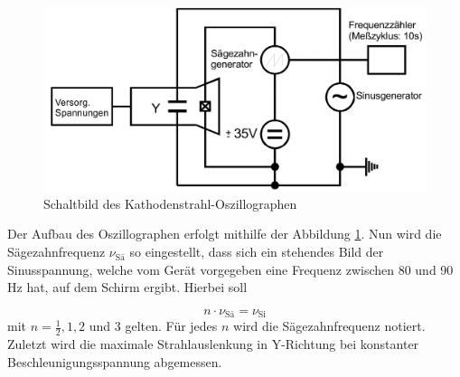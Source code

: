 \begin{figure}[h!]
	\centering
	\includegraphics[width=1\linewidth]{aufbau2.png}
	\caption{Schaltbild des Kathodenstrahl-Oszillographen}
	\label{fig:aufbau2}
\end{figure}
Der Aufbau des Oszillographen erfolgt mithilfe der Abbildung \ref{fig:aufbau2}. Nun wird die Sägezahnfrequenz $\nu_{\text{Sä}}$ so eingestellt, dass sich ein stehendes Bild der Sinusspannung, welche vom Gerät vorgegeben eine 
Frequenz zwischen 80 und 90\,Hz hat, auf dem Schirm ergibt. Hierbei soll

\begin{equation*}
n \cdot \nu_{\text{Sä}} = \nu_{\text{Si}}
\end{equation*}
mit $n = \frac{1}{2}, 1, 2$ und 3 gelten. Für jedes $n$ wird die Sägezahnfrequenz notiert. Zuletzt wird die maximale Strahlauslenkung in Y-Richtung bei konstanter Beschleunigungsspannung abgemessen.